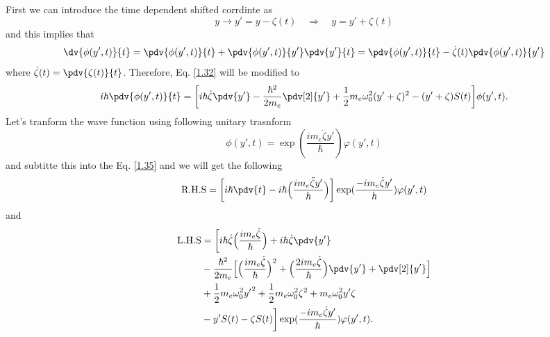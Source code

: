 \noindent
First we can introduce the time dependent shifted corrdinte as
\begin{equation} \label{1.33}
    y \rightarrow y' = y - \zeta(t) \quad \Rightarrow \quad
    y = y' + \zeta(t)
\end{equation}
and this implies that
\begin{equation} \label{1.34}
    \dv{\phi(y',t)}{t} = \pdv{\phi(y',t)}{t} + \pdv{\phi(y',t)}{y'}\pdv{y'}{t} =
    \pdv{\phi(y',t)}{t} - \dot{\zeta}(t)\pdv{\phi(y',t)}{y'}
\end{equation}
where $\dot{\zeta}(t) = \pdv{\zeta(t)}{t}$.
Therefore, Eq. \eqref{1.32} will be modified to
\begin{equation} \label{1.35}
  \begin{aligned}
    i \hbar \pdv{\phi(y',t)}{t}  =
    \bigg[
    i \hbar\dot{\zeta}\pdv{y'}
    -
    \frac{\hbar^2}{2m_e}
    \pdv[2]{{y'}} +
    \frac{1}{2}m_e \omega_0^2(y' + \zeta)^2
    - (y' + \zeta) S(t)
    \bigg]
    \phi(y',t).
  \end{aligned}
\end{equation}
Let's tranform the wave function using following unitary trasnform
\begin{equation} \label{1.36}
    \phi(y',t) = \exp(\frac{im_e\dot{\zeta}y'}{\hbar})\varphi(y',t)
\end{equation}
and subtitte this into the Eq. \eqref{1.35} and we will get the following
\begin{equation} \label{1.37}
  \text{R.H.S} =  \bigg[ i \hbar \pdv{t} -
i \hbar \Big(\frac{im_e \ddot{\zeta} y'}{\hbar}\Big)\bigg]  \exp(\frac{-im_e\dot{\zeta}y'}{\hbar})\varphi(y',t)
\end{equation}
and
\begin{equation} \label{1.38}
  \begin{aligned}
    \text{L.H.S} & =  \bigg[
      i \hbar \dot{\zeta}  \Big(\frac{im_e \dot{\zeta}}{\hbar}\Big)  +
      i \hbar \dot{\zeta} \pdv{y'} \\
      &
      -
      \frac{\hbar^2}{2m_e}\Big[
        \Big(\frac{im_e \dot{\zeta}}{\hbar}\Big)^2
        + \Big(\frac{2im_e \dot{\zeta}}{\hbar}\Big) \pdv{{y'}}
        + \pdv[2]{{y'}}
      \Big] \\
      &
      +\frac{1}{2}m_e\omega_0^2 {y'}^2 + \frac{1}{2}m_e\omega_0^2 \zeta^2 +
      m_e\omega_0^2 y'\zeta \\
      & -
      y'S(t) - \zeta S(t)
    \bigg]  \exp(\frac{-im_e\dot{\zeta}y'}{\hbar})\varphi(y',t).
  \end{aligned}
\end{equation}

